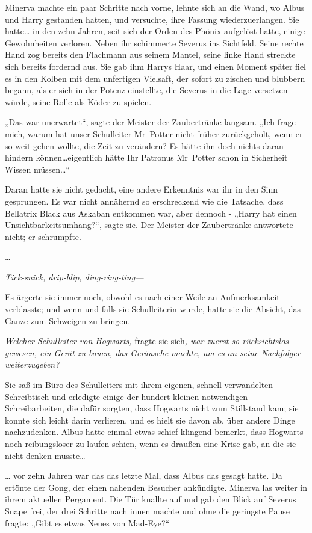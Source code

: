 {Minerva machte ein paar Schritte nach vorne, lehnte sich an die Wand, wo Albus und Harry gestanden hatten, und versuchte, ihre Fassung wiederzuerlangen. Sie hatte… in den zehn Jahren, seit sich der Orden des Phönix aufgelöst hatte, einige Gewohnheiten verloren. Neben ihr schimmerte Severus ins Sichtfeld. Seine rechte Hand zog bereits den Flachmann aus seinem Mantel, seine linke Hand streckte sich bereits fordernd aus. Sie gab ihm Harrys Haar, und einen Moment später fiel es in den Kolben mit dem unfertigen Vielsaft, der sofort zu zischen und blubbern begann, als er sich in der Potenz einstellte, die Severus in die Lage versetzen würde, seine Rolle als Köder zu spielen.

„Das war unerwartet“, sagte der Meister der Zaubertränke langsam. „Ich frage mich, warum hat unser Schulleiter Mr~Potter nicht früher zurückgeholt, wenn er so weit gehen wollte, die Zeit zu verändern? Es hätte ihn doch nichts daran hindern können…eigentlich hätte Ihr Patronus Mr~Potter schon in Sicherheit Wissen müssen…“

Daran hatte sie nicht gedacht, eine andere Erkenntnis war ihr in den Sinn gesprungen. Es war nicht annähernd so erschreckend wie die Tatsache, dass Bellatrix Black aus Askaban entkommen war, aber dennoch - „Harry hat einen Unsichtbarkeitsumhang?“, sagte sie. Der Meister der Zaubertränke antwortete nicht; er schrumpfte.

…

\emph{Tick-snick, drip-blip, ding-ring-ting—}

Es ärgerte sie immer noch, obwohl es nach einer Weile an Aufmerksamkeit verblasste; und wenn und falls sie Schulleiterin wurde, hatte sie die Absicht, das Ganze zum Schweigen zu bringen.

\emph{Welcher Schulleiter von Hogwarts,} fragte sie sich\emph{, war zuerst so rücksichtslos gewesen, ein Gerät zu bauen, das Geräusche machte, um es an seine Nachfolger weiterzugeben?}

Sie saß im Büro des Schulleiters mit ihrem eigenen, schnell verwandelten Schreibtisch und erledigte einige der hundert kleinen notwendigen Schreibarbeiten, die dafür sorgten, dass Hogwarts nicht zum Stillstand kam; sie konnte sich leicht darin verlieren, und es hielt sie davon ab, über andere Dinge nachzudenken. Albus hatte einmal etwas schief klingend bemerkt, dass Hogwarts noch reibungsloser zu laufen schien, wenn es draußen eine Krise gab, an die sie nicht denken musste…

… vor zehn Jahren war das das letzte Mal, dass Albus das gesagt hatte. Da ertönte der Gong, der einen nahenden Besucher ankündigte. Minerva las weiter in ihrem aktuellen Pergament. Die Tür knallte auf und gab den Blick auf Severus Snape frei, der drei Schritte nach innen machte und ohne die geringste Pause fragte: „Gibt es etwas Neues von Mad-Eye?“

}
